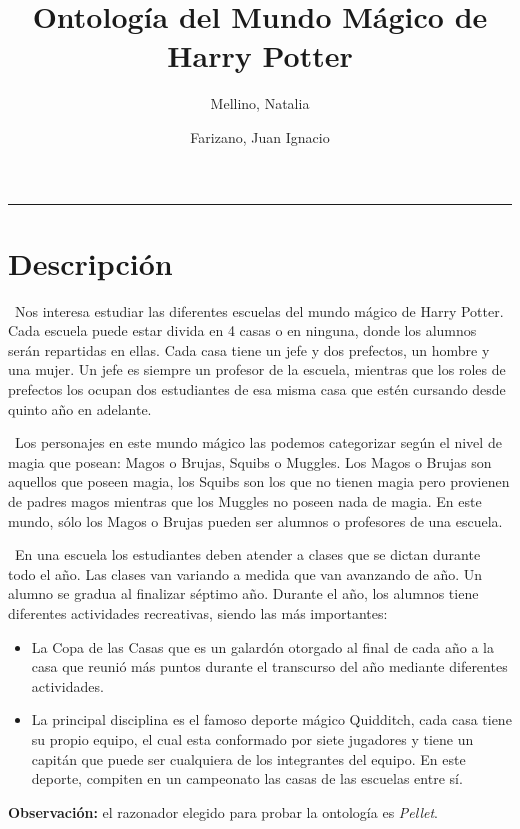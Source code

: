 \documentclass[11pt]{article}
\title{
    Ontología del Mundo Mágico de Harry Potter}
\author{Mellino, Natalia \and Farizano, Juan Ignacio}
\date{}
\begin{document}
\maketitle

\noindent\rule{\textwidth}{1pt}

\section{Descripción}

\-\ Nos interesa estudiar las diferentes escuelas del mundo mágico de Harry Potter.
Cada escuela puede estar divida en 4 casas o en ninguna, donde los alumnos serán 
repartidas en ellas. Cada casa tiene un jefe y dos prefectos, un hombre y una 
mujer. Un jefe es siempre un profesor de la escuela, mientras que los roles de 
prefectos los ocupan dos estudiantes de esa misma casa que estén cursando desde 
quinto año en adelante.

\-\ Los personajes en este mundo mágico las podemos categorizar según el nivel de 
magia que posean: Magos o Brujas, Squibs o Muggles. Los Magos o Brujas son 
aquellos que poseen magia, los Squibs son los que no tienen magia pero provienen 
de padres magos mientras que los Muggles no poseen nada de magia. En este mundo, 
sólo los Magos o Brujas pueden ser alumnos o profesores de una escuela.

\-\ En una escuela los estudiantes deben atender a clases que se dictan durante todo 
el año. Las clases van variando a medida que van avanzando de año. Un alumno se 
gradua al finalizar séptimo año.
Durante el año, los alumnos tiene diferentes actividades recreativas, siendo las 
más importantes:
    \begin{itemize}
        \item La Copa de las Casas que es un galardón otorgado al final de cada 
        año a la casa que reunió más puntos durante el transcurso del año 
        mediante diferentes actividades.
        \item La principal disciplina es el famoso deporte mágico Quidditch, 
        cada casa tiene su propio equipo, el cual esta conformado por siete 
        jugadores y tiene un capitán que puede ser cualquiera de los integrantes 
        del equipo. En este deporte, compiten en un campeonato las casas de las 
        escuelas entre sí. 
    \end{itemize}

\textbf{Observación:} el razonador elegido para probar la ontología es \emph{Pellet}.
    
\end{document}
